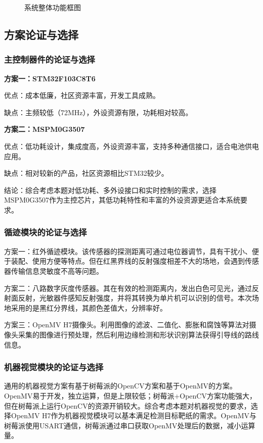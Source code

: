 \documentclass[UTF-8,zihao=-4]{ctexart}
\begin{document}
\begin{figure}[H]
	\centering
	\caption{系统整体功能框图}
	\label{fig:system_block}
\end{figure}

\subsection{方案论证与选择}
\subsubsection{主控制器件的论证与选择}
    \textbf{方案一：STM32F103C8T6}
    
    优点：成本低廉，社区资源丰富，开发工具成熟。
    
    缺点：主频较低（72MHz），外设资源有限，功耗相对较高。
    
    \textbf{方案二：MSPM0G3507}
    
    优点：低功耗设计，集成度高，外设资源丰富，支持多种通信接口，适合电池供电应用。
    
    缺点：相对较新的产品，社区资源相比STM32较少。
    
    结论：综合考虑本题对低功耗、多外设接口和实时控制的需求，选择MSPM0G3507作为主控芯片，其低功耗特性和丰富的外设资源更适合本系统要求。


\subsubsection{循迹模块的论证与选择}
    方案一：红外循迹模块。该传感器的探测距离可通过电位器调节，具有干扰小、便于装配、使用方便等特点。但在红黑界线的反射强度相差不大的场地，会遇到传感器传输信息灵敏度不高等问题。

    方案二：八路数字灰度传感器。其在有效的检测距离内，发出白色可见光，通过反射面反射，光敏器件感知反射强度，并将其转换为单片机可以识别的信号。本次场地采用的是黑红分界线，其颜色差值大，分辨率好。

    方案三：OpenMV H7摄像头。利用图像的滤波、二值化、膨胀和腐蚀等算法对摄像头采集的图像进行预处理，然后利用边缘检测和形状识别算法获得引导线的路线信息。

\subsubsection{机器视觉模块的论证与选择}
    通用的机器视觉方案有基于树莓派的OpenCV方案和基于OpenMV的方案。OpenMV易于开发，独立运算，但是上限较低；树莓派+OpenCV方案功能强大，但在树莓派上运行OpenCV的资源开销较大。综合考虑本题对机器视觉的要求，选择OpenMV H7作为机器视觉模块可以基本满足检测目标靶纸的需求。OpenMV与树莓派使用USART通信，树莓派通过串口获取OpenMV处理后的数据，减小运算量。
\end{document}
